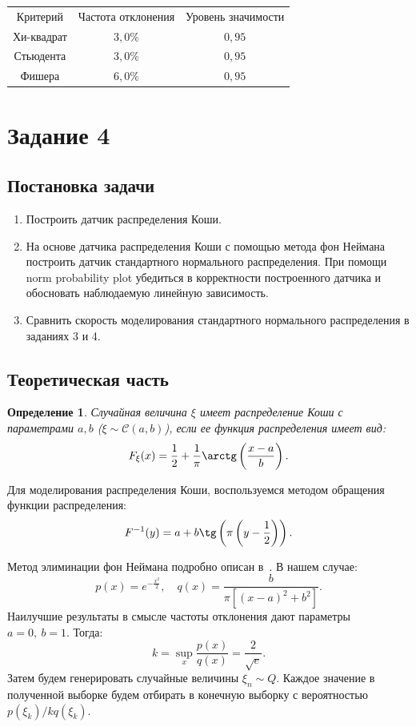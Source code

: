 \documentclass[12pt, a4paper]{article} %
\newtheorem{Def}{Определение}
\begin{document}
\begin{tabular}[H]{ccc}
    Критерий & Частота отклонения & Уровень значимости \\
    Хи-квадрат & $3{,}0\%$ &  $0{,}95$ \\
    Стьюдента &  $3{,}0\%$ &  $0{,}95$ \\
    Фишера & $6{,}0\%$ & $0{,}95$
\end{tabular} 

\section{Задание 4}
\subsection{Постановка задачи}
\begin{enumerate}
\item Построить датчик распределения Коши.
\item На основе датчика распределения Коши с помощью метода фон Неймана построить датчик стандартного нормального распределения. При помощи norm probability plot убедиться в корректности построенного датчика и обосновать наблюдаемую линейную зависимость.
\item Сравнить скорость моделирования стандартного нормального распределения в заданиях 3 и 4.
\end{enumerate}  

\subsection{Теоретическая часть}

\begin{Def}
    Случайная величина $\xi$ имеет распределение Коши с параметрами  $a, b$
    ($\xi \sim \mathcal{C}(a, b)$), 
    если ее функция распределения имеет вид:
    \[
        F_\xi(x) = \frac{1}{2} + \frac{1}{\pi} \arctg\left( \frac{x - a}{b} \right).
    \] 
\end{Def} 
    Для моделирования распределения Коши, воспользуемся методом обращения 
    функции распределения:
    \[
        F^{-1}(y) = a + b \tg\left( \pi \left( y - \frac{1}{2} \right) \right).
    \] 

Метод элиминации фон Неймана подробно описан в~\cite{Bishop}.
В нашем случае:
\[
    p(x) = e^{-\frac{x^2}{2}},\quad 
    q(x) = \frac{b}{\pi \left[ (x - a)^2 + b^2 \right]}.
\]
Наилучшие результаты в смысле частоты отклонения дают параметры $a=0,\ b=1$.
Тогда:
 \[
     k = \sup_x \frac{p(x)}{q(x)} = \frac{2}{\sqrt e}.
\] 
Затем будем генерировать случайные величины $\xi_n \sim Q$.
Каждое значение в полученной выборке будем отбирать в конечную выборку с вероятностью  $p(\xi_k) \big/ kq(\xi_k)$.
\end{document}
